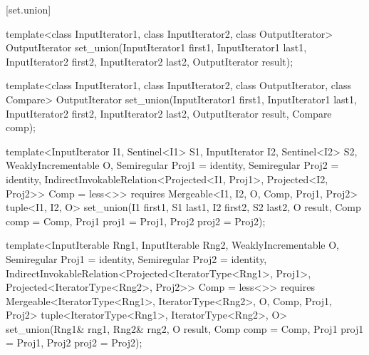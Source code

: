 [set.union]{}

%
\begin{removedblock}
\begin{itemdecl}
template<class InputIterator1, class InputIterator2,
         class OutputIterator>
  OutputIterator
    set_union(InputIterator1 first1, InputIterator1 last1,
              InputIterator2 first2, InputIterator2 last2,
              OutputIterator result);

template<class InputIterator1, class InputIterator2,
         class OutputIterator, class Compare>
  OutputIterator
    set_union(InputIterator1 first1, InputIterator1 last1,
              InputIterator2 first2, InputIterator2 last2,
              OutputIterator result, Compare comp);
\end{itemdecl}
\end{removedblock}
\begin{addedblock}
\begin{itemdecl}
template<InputIterator I1, Sentinel<I1> S1, InputIterator I2, Sentinel<I2> S2,
    WeaklyIncrementable O, Semiregular Proj1 = identity, Semiregular Proj2 = identity,
    IndirectInvokableRelation<Projected<I1, Proj1>, Projected<I2, Proj2>> Comp = less<>>
  requires Mergeable<I1, I2, O, Comp, Proj1, Proj2>
  tuple<I1, I2, O>
    set_union(I1 first1, S1 last1, I2 first2, S2 last2, O result, Comp comp = Comp{},
              Proj1 proj1 = Proj1{}, Proj2 proj2 = Proj2{});

template<InputIterable Rng1, InputIterable Rng2, WeaklyIncrementable O,
    Semiregular Proj1 = identity, Semiregular Proj2 = identity,
    IndirectInvokableRelation<Projected<IteratorType<Rng1>, Proj1>,
      Projected<IteratorType<Rng2>, Proj2>> Comp = less<>>
  requires Mergeable<IteratorType<Rng1>, IteratorType<Rng2>, O, Comp, Proj1, Proj2>
  tuple<IteratorType<Rng1>, IteratorType<Rng2>, O>
    set_union(Rng1& rng1, Rng2& rng2, O result, Comp comp = Comp{},
              Proj1 proj1 = Proj1{}, Proj2 proj2 = Proj2{});
\end{itemdecl}
\end{addedblock}


